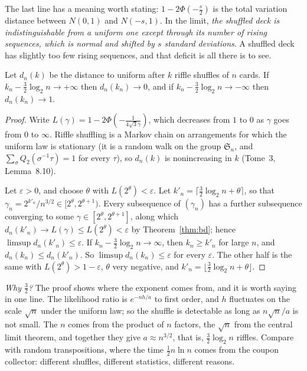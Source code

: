 The last line has a meaning worth stating: $1-2\Phi(-\frac s2)$ is the total variation distance between $N(0,1)$ and $N(-s,1)$. In the limit, \emph{the shuffled
deck is indistinguishable from a uniform one except through its number of rising sequences, which is normal and shifted by $s$ standard
deviations}. A shuffled deck has slightly too few rising sequences, and that deficit is all there is to see.

\begin{corollary}\label{cor:riffle}
Let $d_n(k)$ be the distance to uniform after $k$ riffle shuffles of $n$ cards. If $k_n-\frac32\log_2n\to+\infty$ then $d_n(k_n)\to0$, and if $k_n-\frac32\log_2n\to-\infty$ then $d_n(k_n)\to1$.
\end{corollary}

\begin{proof}
Write $L(\gamma)=1-2\Phi(-\frac1{4\sqrt3\gamma})$, which decreases from $1$ to $0$ as $\gamma$ goes from $0$ to $\infty$. Riffle shuffling is a Markov chain on arrangements for
which the uniform law is stationary (it is a random walk on the group $\mathfrak S_n$, and $\sum_\sigma Q_2(\sigma^{-1}\tau)=1$ for every $\tau$), so $d_n(k)$ is
nonincreasing in $k$ (Tome~3, Lemma~8.10).

Let $\varepsilon>0$, and choose $\theta$ with $L(2^\theta)<\varepsilon$. Let $k'_n=\lceil\frac32\log_2n+\theta\rceil$, so that $\gamma_n=2^{k'_n}/n^{3/2}\in[2^\theta,2^{\theta+1})$. Every subsequence of $(\gamma_n)$ has a further
subsequence converging to some $\gamma\in[2^\theta,2^{\theta+1}]$, along which $d_n(k'_n)\to L(\gamma)\le L(2^\theta)<\varepsilon$ by Theorem~\ref{thm:bd}; hence $\limsup d_n(k'_n)\le\varepsilon$. If $k_n-\frac32\log_2n\to\infty$,
then $k_n\ge k'_n$ for large $n$, and $d_n(k_n)\le d_n(k'_n)$. So $\limsup d_n(k_n)\le\varepsilon$ for every $\varepsilon$. The other half is the same with $L(2^\theta)>1-\varepsilon$, $\theta$ very negative, and $k'_n=\lfloor\frac32\log_2n+\theta\rfloor$.
\end{proof}

\emph{Why $\frac32$?} The proof shows where the exponent comes from, and it is worth saying in one line. The likelihood ratio is $e^{-nh/a}$ to first order, and $h$ fluctuates
on the scale $\sqrt n$ under the uniform law; so the shuffle is detectable as long as $n\sqrt n/a$ is not small. The $n$ comes from the product of $n$ factors, the $\sqrt n$ from
the central limit theorem, and together they give $a\approx n^{3/2}$, that is, $\frac32\log_2n$ riffles. Compare with random transpositions, where the time
$\frac12n\ln n$ comes from the coupon collector: different shuffles, different statistics, different reasons.

